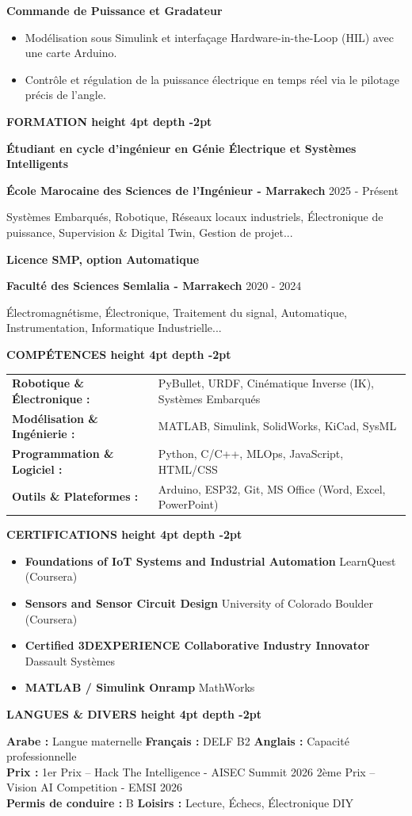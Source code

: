 \documentclass[10pt,a4paper]{../../altacv}
\renewcommand{\cvsection}[2][]{%
  \medskip%
  {\color{heading}\LARGE\bfseries #2 \hspace{0.2em}\leaders\vrule height 4pt depth -2pt\hfill\mbox{}}\par\smallskip
}
\renewcommand{\cvevent}[4]{%
  {\large\bfseries\color{accent}#1\par}
  \smallskip\normalsize
  \ifstrequal{#2}{}{}{%
    \textbf{\color{emphasis}#2\ifstrequal{#4}{}{}{ - #4}}%
  }%
  \hfill
  \ifstrequal{#3}{}{}{{\small#3}}%
  \par\smallskip
}
\begin{document}
{\large\bfseries\color{accent} Commande de Puissance et Gradateur}\\[0.05cm]
\begin{itemize}
  \item Modélisation sous Simulink et interfaçage Hardware-in-the-Loop (HIL) avec une carte Arduino.
  \item Contrôle et régulation de la puissance électrique en temps réel via le pilotage précis de l'angle.
\end{itemize}

\cvsection{FORMATION}
\cvevent{Étudiant en cycle d'ingénieur en Génie Électrique et Systèmes Intelligents}{École Marocaine des Sciences de l'Ingénieur}{2025 - Présent}{Marrakech}
\small Systèmes Embarqués, Robotique, Réseaux locaux industriels, Électronique de puissance, Supervision \& Digital Twin, Gestion de projet...

\cvevent{Licence SMP, option Automatique}{Faculté des Sciences Semlalia}{2020 - 2024}{Marrakech}
\small Électromagnétisme, Électronique, Traitement du signal, Automatique, Instrumentation, Informatique Industrielle...

\cvsection{COMPÉTENCES}
\begin{tabular}{@{}ll@{}}
\textbf{Robotique \& Électronique :} & PyBullet, URDF, Cinématique Inverse (IK), Systèmes Embarqués \\[1pt]
\textbf{Modélisation \& Ingénierie :} & MATLAB, Simulink, SolidWorks, KiCad, SysML \\[1pt]
\textbf{Programmation \& Logiciel :} & Python, C/C++, MLOps, JavaScript, HTML/CSS \\[1pt]
\textbf{Outils \& Plateformes :} & Arduino, ESP32, Git, MS Office (Word, Excel, PowerPoint) \\
\end{tabular}

\cvsection{CERTIFICATIONS}
\begin{itemize}[leftmargin=*, label=\textbullet, itemsep=2pt]
  \item \textbf{Foundations of IoT Systems and Industrial Automation} \hfill {\color{emphasis}LearnQuest (Coursera)}
  \item \textbf{Sensors and Sensor Circuit Design} \hfill {\color{emphasis}University of Colorado Boulder (Coursera)}
  \item \textbf{Certified 3DEXPERIENCE Collaborative Industry Innovator} \hfill {\color{emphasis}Dassault Systèmes}
  \item \textbf{MATLAB / Simulink Onramp} \hfill {\color{emphasis}MathWorks}
\end{itemize}

\cvsection{LANGUES \& DIVERS}
\textbf{Arabe :} Langue maternelle \hfill \textbf{Français :} DELF B2 \hfill \textbf{Anglais :} Capacité professionnelle\\[2pt]
\textbf{Prix :} 1er Prix -- Hack The Intelligence - AISEC Summit 2026 \hfill 2ème Prix -- Vision AI Competition - EMSI 2026\\[2pt]
\textbf{Permis de conduire :} B \hfill \textbf{Loisirs :} Lecture, Échecs, Électronique DIY
\end{document}
